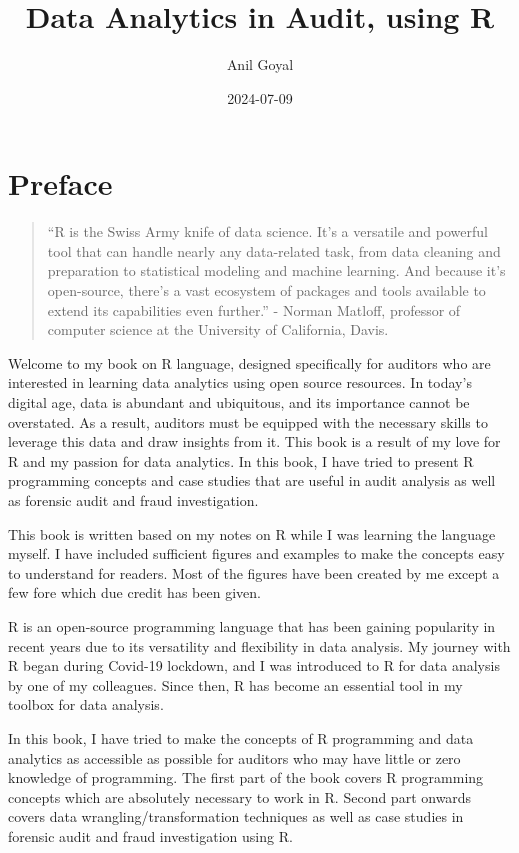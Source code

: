 \documentclass[
]{book}
\title{Data Analytics in Audit, using R}
\author{Anil Goyal}
\date{2024-07-09}
\begin{document}
\maketitle

{
\setcounter{tocdepth}{1}
\tableofcontents
}
\hypertarget{preface}{%
\chapter*{Preface}\label{preface}}

\begin{quote}
``R is the Swiss Army knife of data science. It's a versatile and powerful tool that can handle nearly any data-related task, from data cleaning and preparation to statistical modeling and machine learning. And because it's open-source, there's a vast ecosystem of packages and tools available to extend its capabilities even further.'' - Norman Matloff, professor of computer science at the University of California, Davis.
\end{quote}

Welcome to my book on R language, designed specifically for auditors who are interested in learning data analytics using open source resources. In today's digital age, data is abundant and ubiquitous, and its importance cannot be overstated. As a result, auditors must be equipped with the necessary skills to leverage this data and draw insights from it. This book is a result of my love for R and my passion for data analytics. In this book, I have tried to present R programming concepts and case studies that are useful in audit analysis as well as forensic audit and fraud investigation.

This book is written based on my notes on R while I was learning the language myself. I have included sufficient figures and examples to make the concepts easy to understand for readers. Most of the figures have been created by me except a few fore which due credit has been given.

R is an open-source programming language that has been gaining popularity in recent years due to its versatility and flexibility in data analysis. My journey with R began during Covid-19 lockdown, and I was introduced to R for data analysis by one of my colleagues. Since then, R has become an essential tool in my toolbox for data analysis.

In this book, I have tried to make the concepts of R programming and data analytics as accessible as possible for auditors who may have little or zero knowledge of programming. The first part of the book covers R programming concepts which are absolutely necessary to work in R. Second part onwards covers data wrangling/transformation techniques as well as case studies in forensic audit and fraud investigation using R.
\end{document}
